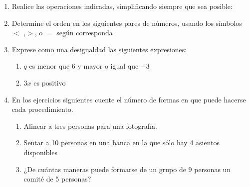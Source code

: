 \documentclass[fleqn]{article}
\begin{document}
\begin{enumerate}
  \item Realice las operaciones indicadas, simplificando siempre que sea posible:
  \begin{enumerate}
  \end{enumerate}
  \item Determine el orden en los siguientes pares de números, usando los símbolos $<$ ,$>$, o $=$ según corresponda
  \begin{enumerate}
  \end{enumerate}
  \item Exprese como una desigualdad las siguientes expresiones:
  \begin{enumerate}
    \item $ q $ es menor que 6 y mayor o igual que $ -3 $ 
    \item $3x$ es positivo   
  \end{enumerate}
    \item En los ejercicios siguientes cuente el número de formas en que puede hacerse cada procedimiento.
  \begin{enumerate}
  \item Alinear a tres personas para una fotografía.
  \item Sentar a 10 personas en una banca en la que sólo hay 4 asientos disponibles
  \item ¿De cuántas maneras puede formarse de un grupo de 9 personas un comité de 5 personas?
  \end{enumerate}

\end{enumerate}
\end{document}
